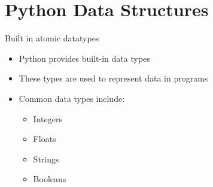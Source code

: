 \documentclass{beamer}
\begin{document}
\section{Python Data Structures}
\begin{frame}{Built in atomic datatypes}
    \begin{itemize}
        \item Python provides built-in data types
        \item These types are used to represent data in programs
        \item Common data types include:
        \begin{itemize}
            \item Integers
            \item Floats
            \item Strings
            \item Booleans
        \end{itemize}
    \end{itemize}

\end{frame}
\end{document}
